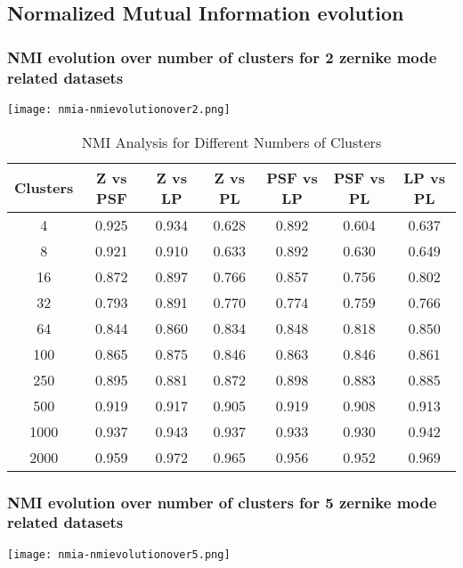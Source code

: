 \subsection{Normalized Mutual Information evolution}

	\subsubsection{NMI evolution over number of clusters for 2 zernike mode related datasets}
		\begin{figure*}[ht!]
			\centering
			\texttt{[image: nmia-nmievolutionover2.png]}
		\end{figure*}
		\begin{table}[!h]
		\centering
		\begin{tabular}{|c|c|c|c|c|c|c|}
\hline
\textbf{Clusters} & \textbf{Z vs PSF} & \textbf{Z vs LP} & \textbf{Z vs PL} & \textbf{PSF vs LP} & \textbf{PSF vs PL} & \textbf{LP vs PL} \\
\hline
4   & 0.925 & 0.934 & 0.628 & 0.892 & 0.604 & 0.637 \\
8   & 0.921 & 0.910 & 0.633 & 0.892 & 0.630 & 0.649 \\
16  & 0.872 & 0.897 & 0.766 & 0.857 & 0.756 & 0.802 \\
32  & 0.793 & 0.891 & 0.770 & 0.774 & 0.759 & 0.766 \\
64  & 0.844 & 0.860 & 0.834 & 0.848 & 0.818 & 0.850 \\
100 & 0.865 & 0.875 & 0.846 & 0.863 & 0.846 & 0.861 \\
250 & 0.895 & 0.881 & 0.872 & 0.898 & 0.883 & 0.885 \\
500 & 0.919 & 0.917 & 0.905 & 0.919 & 0.908 & 0.913 \\
1000 & 0.937 & 0.943 & 0.937 & 0.933 & 0.930 & 0.942 \\
2000 & 0.959 & 0.972 & 0.965 & 0.956 & 0.952 & 0.969 \\
\hline
\end{tabular}
\caption{NMI Analysis for Different Numbers of Clusters}
\end{table}		
		\FloatBarrier
		
	\subsubsection{NMI evolution over number of clusters for 5 zernike mode related datasets}
		\begin{figure*}[ht!]
			\centering
			\texttt{[image: nmia-nmievolutionover5.png]}
		\end{figure*}
		
